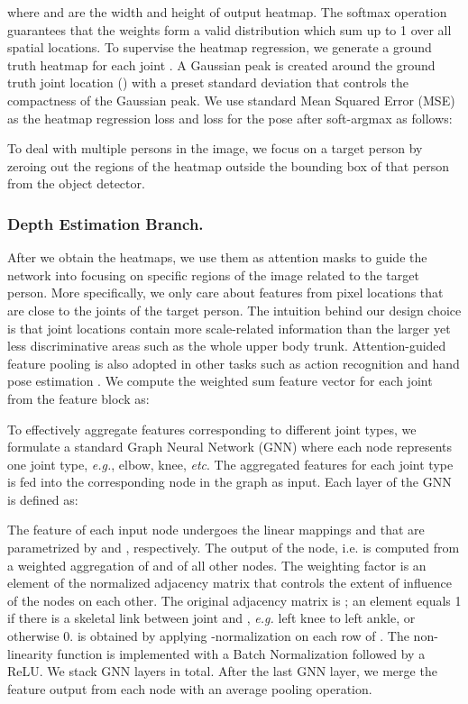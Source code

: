 \documentclass[runningheads]{llncs}
\begin{document}
where  and  are the width and height of output heatmap. The softmax operation guarantees that the weights  form a valid distribution which sum up to 1 over all spatial locations.
To supervise the heatmap regression, we generate a
ground truth heatmap  for each joint . A Gaussian peak is created around the ground truth joint location () with a preset standard deviation that controls the compactness of the Gaussian peak. We use standard Mean Squared Error (MSE) as the heatmap regression loss and  loss for the pose after soft-argmax as follows:

To deal with multiple persons in the image, we focus on a target person by zeroing out the regions of the heatmap outside the bounding box of that person from the object detector.

\subsubsection{Depth Estimation Branch.}
After we obtain the heatmaps, we use them as attention masks to guide the network into focusing on specific regions of the image related to the target person. More specifically, we only care about features from pixel locations that are close to the joints of the target person. The intuition behind our design choice is that joint locations contain more scale-related information than the larger yet less discriminative areas such as the whole upper body trunk. Attention-guided feature pooling is also adopted in other tasks such as action recognition \cite{luvizon20182d} and hand pose estimation \cite{iqbal2018hand}.
We compute the weighted sum feature vector  for each joint  
from the feature block  as:

To effectively aggregate features corresponding to different joint types, we formulate a standard Graph Neural Network (GNN) where each node represents one joint type, \textit{e.g.}, elbow, knee, \textit{etc}. The aggregated features  for each joint type  is fed into the corresponding node  in the graph as input. Each layer of the GNN is defined as:

The feature of each input node  undergoes the linear mappings  and  that are parametrized by  and , respectively. The output of the node, i.e.  is computed from a weighted aggregation of
 and  of all other nodes.
The weighting factor  is an element of the normalized adjacency matrix  that controls the extent of influence of the nodes on each other.
The original adjacency matrix is ; an element  equals 1 if there is a skeletal link between joint  and , \textit{e.g.} left knee to left ankle, or otherwise 0.
 is obtained by applying -normalization on each row of .
The non-linearity function  is implemented with a Batch Normalization followed by a ReLU.
We stack  GNN layers in total.
After the last GNN layer, we merge the feature output from each node with an average pooling operation.
\end{document}
